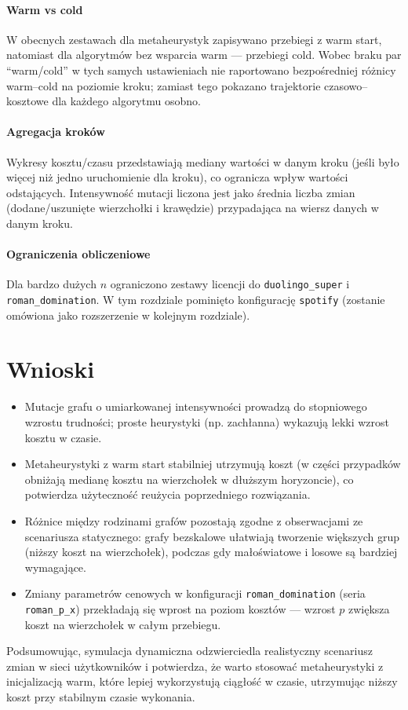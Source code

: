 \paragraph{Warm vs cold} W obecnych zestawach dla metaheurystyk zapisywano przebiegi z warm start, natomiast dla algorytmów bez wsparcia warm — przebiegi cold. Wobec braku par ``warm/cold'' w tych samych ustawieniach nie raportowano bezpośredniej różnicy warm–cold na poziomie kroku; zamiast tego pokazano trajektorie czasowo–kosztowe dla każdego algorytmu osobno.

\paragraph{Agregacja kroków} Wykresy kosztu/czasu przedstawiają mediany wartości w danym kroku (jeśli było więcej niż jedno uruchomienie dla kroku), co ogranicza wpływ wartości odstających. Intensywność mutacji liczona jest jako średnia liczba zmian (dodane/uszunięte wierzchołki i krawędzie) przypadająca na wiersz danych w danym kroku.

\paragraph{Ograniczenia obliczeniowe} Dla bardzo dużych $n$ ograniczono zestawy licencji do \texttt{duolingo\_super} i \texttt{roman\_domination}. W tym rozdziale pominięto konfigurację \texttt{spotify} (zostanie omówiona jako rozszerzenie w kolejnym rozdziale).

\section{Wnioski}

\begin{itemize}
  \item Mutacje grafu o umiarkowanej intensywności prowadzą do stopniowego wzrostu trudności; proste heurystyki (np. zachłanna) wykazują lekki wzrost kosztu w czasie.
  \item Metaheurystyki z warm start stabilniej utrzymują koszt (w części przypadków obniżają medianę kosztu na wierzchołek w dłuższym horyzoncie), co potwierdza użyteczność reużycia poprzedniego rozwiązania.
  \item Różnice między rodzinami grafów pozostają zgodne z obserwacjami ze scenariusza statycznego: grafy bezskalowe ułatwiają tworzenie większych grup (niższy koszt na wierzchołek), podczas gdy małoświatowe i losowe są bardziej wymagające.
  \item Zmiany parametrów cenowych w konfiguracji \texttt{roman\_domination} (seria \texttt{roman\_p\_x}) przekładają się wprost na poziom kosztów — wzrost $p$ zwiększa koszt na wierzchołek w całym przebiegu.
\end{itemize}

Podsumowując, symulacja dynamiczna odzwierciedla realistyczny scenariusz zmian w sieci użytkowników i potwierdza, że warto stosować metaheurystyki z inicjalizacją warm, które lepiej wykorzystują ciągłość w czasie, utrzymując niższy koszt przy stabilnym czasie wykonania.
